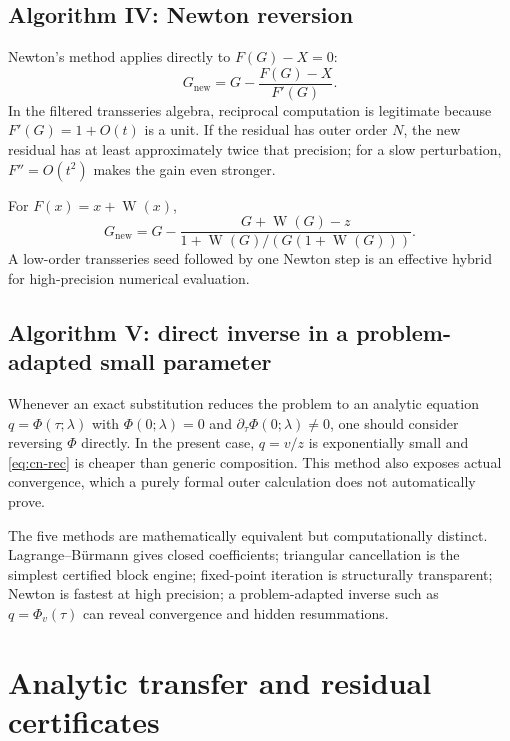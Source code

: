 \documentclass[11pt,oneside]{article}
\theoremstyle{plain}
\theoremstyle{definition}
\theoremstyle{remark}
\newcommand{\W}{\operatorname{W}}
\begin{document}
\subsection{Algorithm IV: Newton reversion}

Newton's method applies directly to \(F(G)-X=0\):
\begin{equation}
 G_{\mathrm{new}}
 =G-\frac{F(G)-X}{F'(G)}.
 \label{eq:Newton-general}
\end{equation}
In the filtered transseries algebra, reciprocal computation is legitimate
because \(F'(G)=1+O(t)\) is a unit.  If the residual has outer order \(N\), the
new residual has at least approximately twice that precision; for a slow
perturbation, \(F''=O(t^2)\) makes the gain even stronger.

For \(F(x)=x+\W(x)\),
\begin{equation}
 G_{\mathrm{new}}
 =G-\frac{G+\W(G)-z}
 {1+\W(G)/(G(1+\W(G)))}.
 \label{eq:Newton-W}
\end{equation}
A low-order transseries seed followed by one Newton step is an effective
hybrid for high-precision numerical evaluation.

\subsection{Algorithm V: direct inverse in a problem-adapted small parameter}

Whenever an exact substitution reduces the problem to an analytic equation
\(q=\Phi(\tau;\lambda)\) with \(\Phi(0;\lambda)=0\) and
\(\partial_\tau\Phi(0;\lambda)\ne0\), one should consider reversing \(\Phi\)
directly.  In the present case, \(q=v/z\) is exponentially small and
\eqref{eq:cn-rec} is cheaper than generic composition.  This method also
exposes actual convergence, which a purely formal outer calculation does not
automatically prove.

\begin{summarybox}
The five methods are mathematically equivalent but computationally distinct.
Lagrange--B\"urmann gives closed coefficients; triangular cancellation is the
simplest certified block engine; fixed-point iteration is structurally
transparent; Newton is fastest at high precision; a problem-adapted inverse
such as \(q=\Phi_v(\tau)\) can reveal convergence and hidden resummations.
\end{summarybox}

\section{Analytic transfer and residual certificates}
\label{sec:certification}
\end{document}

